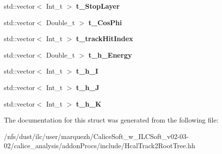 \begin{DoxyCompactItemize}
\item 
std\-::vector$<$ Int\-\_\-t $>$ {\bfseries t\-\_\-\-Stop\-Layer}\label{structHcalTrack2RootTree_1_1EventTracks_ae32fb76d840130f1fbe43953298c06eb}

\item 
std\-::vector$<$ Double\-\_\-t $>$ {\bfseries t\-\_\-\-Cos\-Phi}\label{structHcalTrack2RootTree_1_1EventTracks_a3a1a5db72d1428deed0eca93681c6d37}

\item 
std\-::vector$<$ Int\-\_\-t $>$ {\bfseries t\-\_\-track\-Hit\-Index}\label{structHcalTrack2RootTree_1_1EventTracks_a3ee6bda84967e39d8420784d7c81e022}

\item 
std\-::vector$<$ Double\-\_\-t $>$ {\bfseries t\-\_\-h\-\_\-\-Energy}\label{structHcalTrack2RootTree_1_1EventTracks_a87049feb6b6b6da4118db597631025e5}

\item 
std\-::vector$<$ Int\-\_\-t $>$ {\bfseries t\-\_\-h\-\_\-\-I}\label{structHcalTrack2RootTree_1_1EventTracks_a10f85c6012ecdfa9af4c263e39ed9053}

\item 
std\-::vector$<$ Int\-\_\-t $>$ {\bfseries t\-\_\-h\-\_\-\-J}\label{structHcalTrack2RootTree_1_1EventTracks_a167e2ce014c7f8d4b0607abf2e79d948}

\item 
std\-::vector$<$ Int\-\_\-t $>$ {\bfseries t\-\_\-h\-\_\-\-K}\label{structHcalTrack2RootTree_1_1EventTracks_af635a6fba097932e5915b97e4afff06e}

\end{DoxyCompactItemize}


The documentation for this struct was generated from the following file\-:\begin{DoxyCompactItemize}
\item 
/nfs/dust/ilc/user/marquezh/\-Calice\-Soft\-\_\-w\-\_\-\-I\-L\-C\-Soft\-\_\-v02-\/03-\/02/calice\-\_\-analysis/addon\-Procs/include/Hcal\-Track2\-Root\-Tree.\-hh\end{DoxyCompactItemize}
